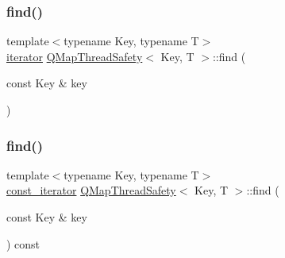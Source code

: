 \mbox{\label{class_q_map_thread_safety_a3e4df3d688c99d259c6245a6f612c096}} 
\subsubsection{\texorpdfstring{find()}{find()}\hspace{0.1cm}{\footnotesize\ttfamily [1/2]}}
{\footnotesize\ttfamily template$<$typename Key, typename T$>$ \\
\hyperlink{class_q_map_thread_safety_a454c8af3f68e6d61aecaf1b918aa525b}{iterator} \hyperlink{class_q_map_thread_safety}{Q\+Map\+Thread\+Safety}$<$ Key, T $>$\+::find (\begin{DoxyParamCaption}\item[{const Key \&}]{key }\end{DoxyParamCaption})\hspace{0.3cm}{\ttfamily [inline]}}

\mbox{\label{class_q_map_thread_safety_a2564aae6f1946dfc48ae0576f4de0434}} 
\subsubsection{\texorpdfstring{find()}{find()}\hspace{0.1cm}{\footnotesize\ttfamily [2/2]}}
{\footnotesize\ttfamily template$<$typename Key, typename T$>$ \\
\hyperlink{class_q_map_thread_safety_aa58d8479729f72b33e305a4d0ca957bd}{const\+\_\+iterator} \hyperlink{class_q_map_thread_safety}{Q\+Map\+Thread\+Safety}$<$ Key, T $>$\+::find (\begin{DoxyParamCaption}\item[{const Key \&}]{key }\end{DoxyParamCaption}) const\hspace{0.3cm}{\ttfamily [inline]}}

\mbox{\label{class_q_map_thread_safety_a3709dc412a794c75c4f678409324006f}} 

